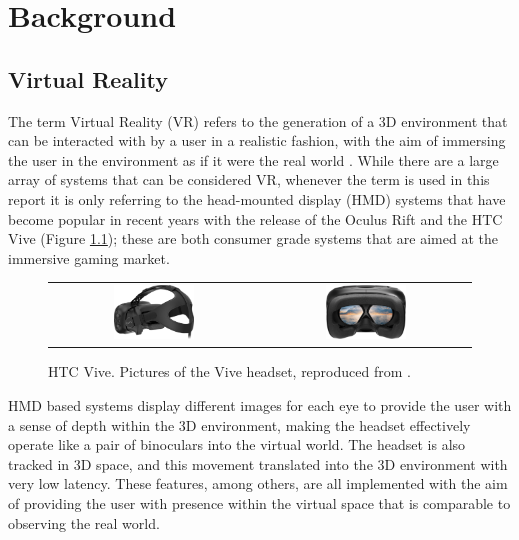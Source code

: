 \chapter{Background}

\section{Virtual Reality}

The term Virtual Reality (VR) refers to the generation of a 3D environment that can be interacted with by a user in a realistic fashion, with the aim of immersing the user in the environment as if it were the real world \cite{WhatVR}. While there are a large array of systems that can be considered VR, whenever the term is used in this report it is only referring to the head-mounted display (HMD) systems that have become popular in recent years with the release of the Oculus Rift \cite{Oculus} and the HTC Vive \cite{Vive} (Figure \ref{fig:Vive}); these are both consumer grade systems that are aimed at the immersive gaming market.

\begin{figure}[H]
    \begin{center}
    \begin{tabular}{ c c }
        \includegraphics[width=0.4\textwidth]{Figures/vive.png} &
        \includegraphics[width=0.4\textwidth]{Figures/vive2.png}
    \end{tabular}
    \caption[HTC Vive]{HTC Vive. Pictures of the Vive headset, reproduced from \cite{Vive}.}
    \label{fig:Vive}
    \end{center}
\end{figure}

HMD based systems display different images for each eye to provide the user with a sense of depth within the 3D environment, making the headset effectively operate like a pair of binoculars into the virtual world. The headset is also tracked in 3D space, and this movement translated into the 3D environment with very low latency. These features, among others, are all implemented with the aim of providing the user with presence within the virtual space that is comparable to observing the real world.

